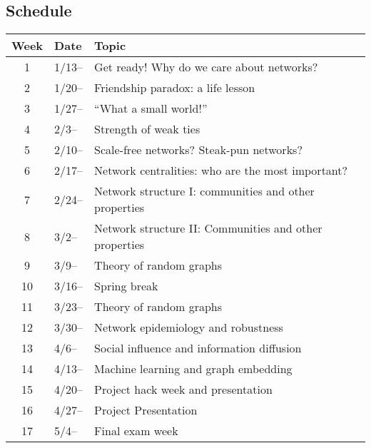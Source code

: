 \subsection{Schedule}\label{sub:schedule}%

\begin{tabular}{@{}cll@{}} \toprule
  Week & Date & Topic \\\midrule
  1 & 1/13-- & Get ready! Why do we care about networks? \\
  2 & 1/20-- & Friendship paradox: a life lesson \\
  3 & 1/27--  & ``What a small world!'' \\
  4 & 2/3--  & Strength of weak ties \\
  5 & 2/10--  & Scale-free networks? Steak-pun networks? \\
  6 & 2/17--  & Network centralities: who are the most important? \\
  7 & 2/24--  & Network structure I: communities and other properties \\
  8 & 3/2--  & Network structure II: Communities and other properties \\
  9 & 3/9--  & Theory of random graphs \\
  10 & 3/16--  & Spring break \\
  11 & 3/23--  & Theory of random graphs \\
  12 & 3/30--  & Network epidemiology and robustness \\
  13 & 4/6--  & Social influence and information diffusion \\
  14 & 4/13--  & Machine learning and graph embedding \\
  15 & 4/20--  & Project hack week and presentation \\
  16 & 4/27--  & Project Presentation \\
  17 & 5/4--  & Final exam week \\
  \bottomrule
\end{tabular}


